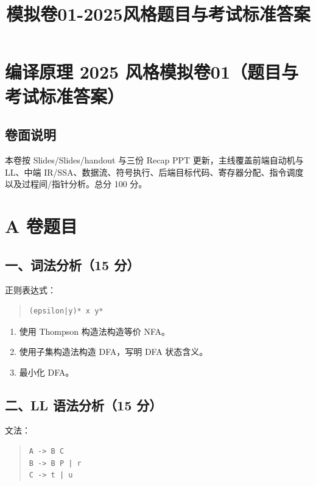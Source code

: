 \documentclass[UTF8,zihao=-4]{ctexart}
\title{模拟卷01-2025风格题目与考试标准答案}
\author{}
\date{}
\begin{document}
\maketitle
\setcounter{tocdepth}{1}
\tableofcontents
\newpage
\section{编译原理 2025 风格模拟卷01（题目与考试标准答案）}


\subsection{卷面说明}


本卷按 Slides/Slides/handout 与三份 Recap PPT 更新，主线覆盖前端自动机与 LL、中端 IR/SSA、数据流、符号执行、后端目标代码、寄存器分配、指令调度以及过程间/指针分析。总分 100 分。


\section{A 卷题目}


\subsection{一、词法分析（15 分）}


正则表达式：


\begin{quote}
\footnotesize
\begin{verbatim}
(epsilon|y)* x y*
\end{verbatim}
\end{quote}


\begin{enumerate}
\item 使用 Thompson 构造法构造等价 NFA。
\item 使用子集构造法构造 DFA，写明 DFA 状态含义。
\item 最小化 DFA。
\end{enumerate}


\subsection{二、LL 语法分析（15 分）}


文法：


\begin{quote}
\footnotesize
\begin{verbatim}
A -> B C
B -> B P | r
C -> t | u
\end{verbatim}
\end{quote}
\end{document}
